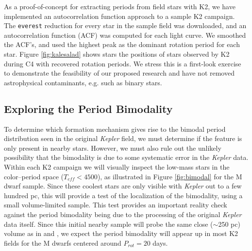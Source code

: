 \documentclass[12pt]{article}
\newcommand{\Kepler}{\textsl{Kepler}\xspace}
\begin{document}
As a proof-of-concept for extracting periods from field stars with K2, we have implemented an autocorrelation function approach to a sample K2 campaign. The {\tt everest} \citep{luger2016} reduction for every star in the sample field was downloaded, and an autocorrelation function (ACF) was computed for each light curve. We smoothed the ACF's, and used the highest peak as the dominant rotation period for each star.
Figure \ref{fig:kalesalad} shows stars the positions of stars observed by K2 during C4 with recovered rotation periods. We stress this is a first-look exercise to demonstrate the feasibility of our proposed research and have not removed astrophysical contaminants, e.g. such as binary stars.






\subsection{Exploring the Period Bimodality}


To determine which formation mechanism gives rise to the bimodal period distribution seen in the original \Kepler field, we must determine if the feature is only present in nearby stars. However, we must also rule out the unlikely possibility that the bimodality is due to some systematic error in the \Kepler data. Within each K2 campaign we will visually inspect the low-mass stars in the color--period space ($T_{eff}<4500$), as illustrated in Figure \ref{fig:bimodal} for the \citet{mcquillan2013} M dwarf sample. Since these coolest stars are only visible with \Kepler out to a few hundred pc, this will provide a test of the localization of the bimodality, using a small volume-limited sample. This test provides an important reality check against the period bimodality being due to the processing of the original \Kepler data itself. Since this initial nearby sample will probe the same close ($\sim$250 pc) volume as in \citet{mcquillan2013} and \citet{davenport2017}, we expect the period bimodality will appear up in most K2 fields for the M dwarfs centered around $P_{rot}=20$ days.
\end{document}
